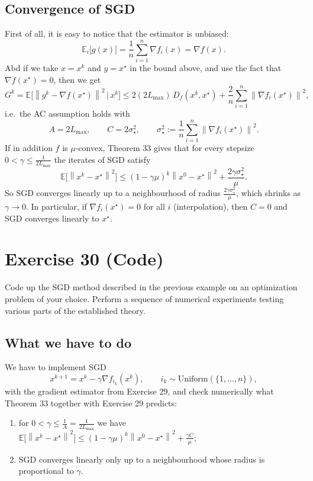 \documentclass[11pt,a4paper]{article}
\newcommand{\E}{\mathbb{E}}
\newcommand{\norm}[1]{\left\| #1 \right\|}
\newcommand{\xs}{x^\star}
\begin{document}
\subsection*{Convergence of SGD}
First of all, it is easy to notice that the estimator is unbiased:
\[
  \E_i\bigl[g(x)\bigr] = \frac{1}{n}\sum_{i=1}^n \nabla f_i(x) = \nabla f(x).
\]
Abd if we take $x = x^k$ and $y = \xs$ in the bound above, and use the fact that 
$\nabla f(\xs) = 0$, then we get
\[
  G^k = \E\bigl[\norm{g^k - \nabla f(\xs)}^2 \,\big|\, x^k\bigr]
  \le 2(2L_{\max})\,D_f(x^k,\xs) + \frac{2}{n}\sum_{i=1}^n \norm{\nabla f_i(\xs)}^2,
\]
i.e.\ the AC assumption holds with
\[
  A = 2L_{\max}, \qquad C = 2\sigma_\star^2, \qquad
  \sigma_\star^2 := \frac{1}{n}\sum_{i=1}^n \norm{\nabla f_i(\xs)}^2 .
\]
If in addition $f$ is $\mu$-convex, Theorem 33 gives that for every stepsize
$0 < \gamma \le \frac{1}{2L_{\max}}$ the iterates of SGD satisfy
\[
  \E\bigl[\norm{x^k - \xs}^2\bigr] \le (1-\gamma\mu)^k\norm{x^0 - \xs}^2 + \frac{2\gamma\sigma_\star^2}{\mu} .
\]
So SGD converges linearly up to a neighbourhood of radius $\frac{2\gamma\sigma_\star^2}{\mu}$,
which shrinks as $\gamma \to 0$. In particular, if $\nabla f_i(\xs) = 0$ for all $i$
(interpolation), then $C = 0$ and SGD converges linearly to $\xs$.

\section*{Exercise 30 (Code)}

Code up the SGD method described in the previous example on an optimization problem of your
choice. Perform a sequence of numerical experiments testing various parts of the established
theory.

\subsection*{What we have to do}
We have to implement SGD
\[
  x^{k+1} = x^k - \gamma\nabla f_{i_k}(x^k), \qquad i_k \sim \mathrm{Uniform}(\{1,\dots,n\}),
\]
with the gradient estimator from Exercise 29, and check numerically what Theorem 33 together
with Exercise 29 predicts:
\begin{enumerate}
  \item for $0 < \gamma \le \frac{1}{A} = \frac{1}{2L_{\max}}$ we have
    $\E\bigl[\norm{x^k - \xs}^2\bigr] \le (1-\gamma\mu)^k\norm{x^0 - \xs}^2 + \frac{\gamma C}{\mu}$;
  \item SGD converges linearly only up to a neighbourhood whose radius is proportional to $\gamma$.
\end{enumerate}
\end{document}
